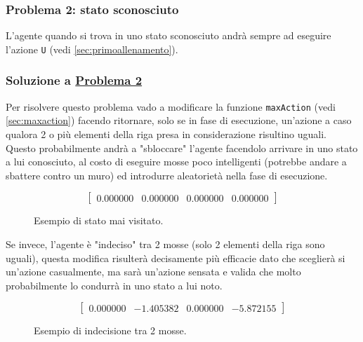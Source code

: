 \subsubsection{Problema 2: stato sconosciuto}
\label{sec:problema2}

L'agente quando si trova in uno stato sconosciuto andr\`{a} sempre ad eseguire l'azione \lstinline[style=cmd]|U| (vedi \autoref{sec:primoallenamento}).

\subsubsection{Soluzione a \hyperref[sec:problema2]{Problema 2}}
\label{sec:solprob2}

Per risolvere questo problema vado a modificare la funzione  \lstinline[style=cmd]|maxAction| (vedi \autoref{sec:maxaction}) facendo ritornare, solo se in fase di esecuzione, un'azione a caso qualora 2 o pi\`{u} elementi della riga presa in considerazione risultino uguali. Questo probabilmente andr\`{a} a "sbloccare" l'agente facendolo arrivare in uno stato a lui conosciuto, al costo di  eseguire mosse poco intelligenti (potrebbe andare a sbattere contro un muro) ed introdurre aleatoriet\`{a} nella fase di esecuzione.\\

\begin{figure}[H]
	\begin{equation*}
		\begin{bmatrix}
			0.000000 &  0.000000 & 0.000000 & 0.000000
		\end{bmatrix}
	\end{equation*}
	\caption{Esempio di stato mai visitato.}
\end{figure}

Se invece, l'agente \`{e} "indeciso" tra 2 mosse (solo 2 elementi della riga sono uguali), questa modifica risulter\`{a} decisamente pi\`{u} efficacie dato che sceglier\`{a} si un'azione casualmente, ma sar\`{a} un'azione sensata e valida che molto probabilmente lo condurr\`{a} in uno stato a lui noto.

\begin{figure}[H]
	\begin{equation*}
		\begin{bmatrix}
			0.000000 &  -1.405382 & 0.000000 & -5.872155
		\end{bmatrix}
	\end{equation*}
	\caption{Esempio di indecisione tra 2 mosse.}
\end{figure}


